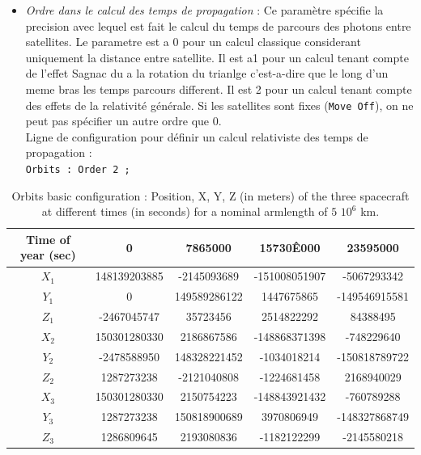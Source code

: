 \documentclass[a4paper,english,12pt]{article}
\begin{document}
\begin{itemize}
\item { \it Ordre dans le calcul des temps de propagation } : Ce param\`etre sp\'ecifie la precision avec lequel est fait le calcul du temps de parcours des photons entre satellites. Le parametre est a 0 pour un calcul classique considerant uniquement la distance entre satellite. Il est a1 pour un calcul tenant compte de l'effet Sagnac du a la rotation du trianlge c'est-a-dire que le long d'un meme bras les temps parcours different. Il est 2 pour un calcul tenant compte des effets de la relativit\'e g\'en\'erale. Si les satellites sont fixes (\texttt{Move Off}), on ne peut pas sp\'ecifier un autre ordre que 0.\\
Ligne de configuration pour d\'efinir un calcul relativiste des temps de propagation : \\
\hphantom{aaaaa}\texttt{Orbits : Order 2 ;}  \\
\end{itemize}

\begin{table}[!ht] 
\caption{Orbits basic configuration : Position, X, Y, Z (in meters) of the three spacecraft at different times  
(in seconds) for a nominal armlength of $5$ $10^6$ km.} 
\begin{center} 
\begin{tabular}{|c|c|c|c|c|} 
\hline 
Time of year (sec)&0& 7865000& 15730Ê000& 23595000 \\ 
\hline 
$X_1$& 148139203885 & -2145093689 & -151008051907 & -5067293342 \\ 
\hline 
$Y_1$& 0 &149589286122 & 1447675865 & -149546915581 \\ 
\hline 
$Z_1$& -2467045747 & 35723456 & 2514822292 & 84388495\\ 
\hline 
$X_2$& 150301280330 & 2186867586 & -148868371398 & -748229640 \\ 
\hline 
$Y_2$& -2478588950 & 148328221452 & -1034018214 & -150818789722\\ 
\hline 
$Z_2$& 1287273238 & -2121040808 & -1224681458 & 2168940029\\ 
\hline 
$X_3$& 150301280330 & 2150754223 & -148843921432 & -760789288 \\ 
\hline 
$Y_3$& 1287273238 & 150818900689 & 3970806949 & -148327868749\\ 
\hline 
$Z_3$&1286809645& 2193080836 & -1182122299 & -2145580218\\ 
\hline 
\end{tabular} 
\end{center} 
\label{table_flexing} 
\end{table}
\end{document}
